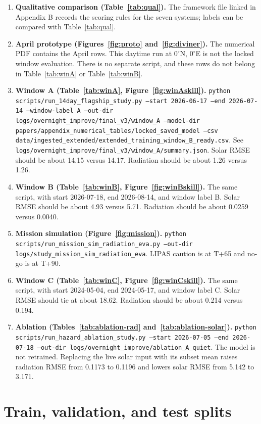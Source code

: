 \begin{enumerate}
\item \textbf{Qualitative comparison (Table~\ref{tab:qual}).} The framework file linked in Appendix B records the scoring rules for the seven systems; labels can be compared with Table~\ref{tab:qual}.
\item \textbf{April prototype (Figures~\ref{fig:proto} and~\ref{fig:diviner}).} The numerical PDF contains the April rows. This daytime run at $0^{\circ}$N, $0^{\circ}$E is not the locked window evaluation. There is no separate script, and these rows do not belong in Table~\ref{tab:winA} or Table~\ref{tab:winB}.
\item \textbf{Window A (Table~\ref{tab:winA}, Figure~\ref{fig:winAskill}).} \texttt{python scripts/run\_14day\_flagship\_study.py --start 2026-06-17 --end 2026-07-14 --window-label A --out-dir logs/overnight\_improve/final\_v3/window\_A --model-dir papers/appendix\_numerical\_tables/locked\_saved\_model --csv data/ingested\_extended/extended\_training\_window\_B\_ready.csv}. See \texttt{logs/overnight\_improve/final\_v3/window\_A/summary.json}. Solar RMSE should be about 14.15 versus 14.17. Radiation should be about 1.26 versus 1.26.
\item \textbf{Window B (Table~\ref{tab:winB}, Figure~\ref{fig:winBskill}).} The same script, with start 2026-07-18, end 2026-08-14, and window label B. Solar RMSE should be about 4.93 versus 5.71. Radiation should be about 0.0259 versus 0.0040.
\item \textbf{Mission simulation (Figure~\ref{fig:mission}).} \texttt{python scripts/run\_mission\_sim\_radiation\_eva.py --out-dir logs/study\_mission\_sim\_radiation\_eva}. LIPAS caution is at T+65 and no-go is at T+90.
\item \textbf{Window C (Table~\ref{tab:winC}, Figure~\ref{fig:winCskill}).} The same script, with start 2024-05-04, end 2024-05-17, and window label C. Solar RMSE should tie at about 18.62. Radiation should be about 0.214 versus 0.194.
\item \textbf{Ablation (Tables~\ref{tab:ablation-rad} and~\ref{tab:ablation-solar}).} \texttt{python scripts/run\_hazard\_ablation\_study.py --start 2026-07-05 --end 2026-07-18 --out-dir logs/overnight\_improve/ablation\_A\_quiet}. The model is not retrained. Replacing the live solar input with its subset mean raises radiation RMSE from 0.1173 to 0.1196 and lowers solar RMSE from 5.142 to 3.171.
\end{enumerate}

\section{Train, validation, and test splits}
\label{app:splits}

